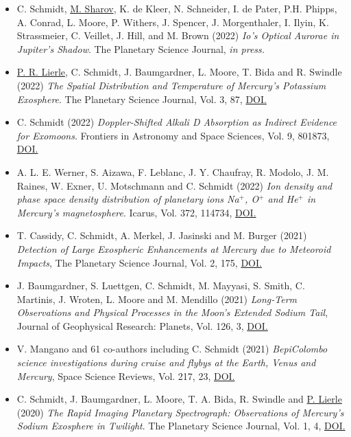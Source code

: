 \documentclass[12pt]{report}
\begin{document}
\begin{itemize} \itemsep -2pt %
  \item C. Schmidt, \underline{M. Sharov}, K. de Kleer, N. Schneider, I. de Pater, P.H. Phipps, A. Conrad, L. Moore, P. Withers, J. Spencer, J. Morgenthaler, I. Ilyin, K. Strassmeier, C. Veillet, J. Hill, and M. Brown (2022) \textit{Io’s Optical Aurorae in Jupiter’s Shadow}. The Planetary Science Journal, \textit{in press.}
  \item \underline{P. R. Lierle}, C. Schmidt, J. Baumgardner, L. Moore, T. Bida and R. Swindle (2022) \textit{The Spatial Distribution and Temperature of Mercury’s Potassium Exosphere}. The Planetary Science Journal, Vol. 3, 87, \href{https://doi.org/10.3847/PSJ/ac5c4d}{DOI.} 
  \item C. Schmidt (2022) \textit{Doppler-Shifted Alkali D Absorption as Indirect Evidence for Exomoons}. Frontiers in Astronomy and Space Sciences, Vol. 9, 801873, \href{https://doi.org/10.3389/fspas.2022.801873}{DOI.}
  \item A. L. E. Werner, S. Aizawa, F. Leblanc, J. Y. Chaufray, R. Modolo, J. M. Raines, W. Exner, U. Motschmann and C. Schmidt (2022) \textit{ Ion density and phase space density distribution of planetary ions Na$^+$, O$^+$ and He$^+$ in Mercury's magnetosphere}. Icarus, Vol. 372, 114734, \href{https://doi.org/10.1016/j.icarus.2021.114734}{DOI.}
  \item  T. Cassidy, C. Schmidt, A. Merkel, J. Jasinski and M. Burger (2021) \textit{Detection of Large Exospheric Enhancements at Mercury due to Meteoroid Impacts}, The Planetary Science Journal, Vol. 2, 175, \href{https://doi.org/10.3847/PSJ/ac1a19}{DOI.}
  \item J. Baumgardner, S. Luettgen, C. Schmidt, M. Mayyasi, S. Smith, C. Martinis, J. Wroten, L. Moore and M. Mendillo (2021) \textit{Long‐Term Observations and Physical Processes in the Moon’s Extended Sodium Tail}, Journal of Geophysical Research: Planets, Vol. 126, 3, \href{https://doi.org/10.1029/2020JE006671}{DOI.}
  \item V. Mangano and 61 co-authors including C. Schmidt (2021) \textit{BepiColombo science investigations during cruise and flybys at the Earth, Venus and Mercury}, Space Science Reviews, Vol. 217, 23, \href{https://doi.org/10.1007/s11214-021-00797-9}{DOI.} 
  \item C. Schmidt, J. Baumgardner, L. Moore, T. A. Bida, R. Swindle and \underline{P. Lierle} (2020) \textit{The Rapid Imaging Planetary Spectrograph: Observations of Mercury's Sodium Exosphere in Twilight}. The Planetary Science Journal, Vol. 1, 4, \href{https://doi.org/10.3847/PSJ/ab76c9}{DOI.}

\end{itemize}
\end{document}
